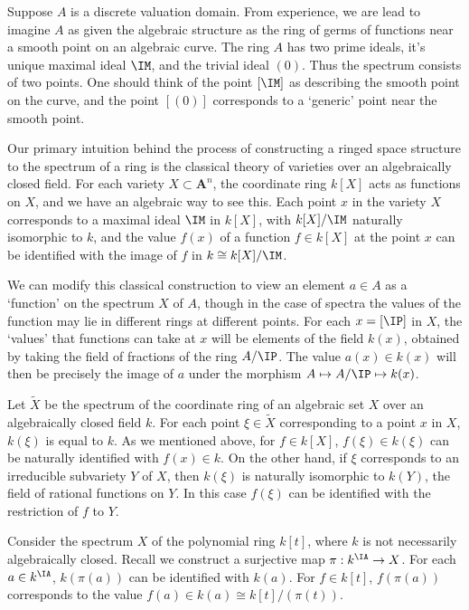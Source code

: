 \begin{example}
    Suppose $A$ is a discrete valuation domain. From experience, we are lead to imagine $A$ as given the algebraic structure as the ring of germs of functions near a smooth point on an algebraic curve. The ring $A$ has two prime ideals, it's unique maximal ideal $\IM$, and the trivial ideal $(0)$. Thus the spectrum consists of two points. One should think of the point $[\IM]$ as describing the smooth point on the curve, and the point $[(0)]$ corresponds to a `generic' point near the smooth point.
\end{example}

Our primary intuition behind the process of constructing a ringed space structure to the spectrum of a ring is the classical theory of varieties over an algebraically closed field. For each variety $X \subset \mathbf{A}^n$, the coordinate ring $k[X]$ acts as functions on $X$, and we have an algebraic way to see this. Each point $x$ in the variety $X$ corresponds to a maximal ideal $\IM$ in $k[X]$, with $k[X]/\IM$ naturally isomorphic to $k$, and the value $f(x)$ of a function $f \in k[X]$ at the point $x$ can be identified with the image of $f$ in $k \cong k[X]/\IM$.

We can modify this classical construction to view an element $a \in A$ as a `function' on the spectrum $X$ of $A$, though in the case of spectra the values of the function may lie in different rings at different points. For each $x = [\IP]$ in $X$, the `values' that functions can take at $x$ will be elements of the field $k(x)$, obtained by taking the field of fractions of the ring $A/\IP$. The value $a(x) \in k(x)$ will then be precisely the image of $a$ under the morphism $A \mapsto A/\IP \mapsto k(x)$.

\begin{example}
    Let $\tilde{X}$ be the spectrum of the coordinate ring of an algebraic set $X$ over an algebraically closed field $k$. For each point $\xi \in \tilde{X}$ corresponding to a point $x$ in $X$, $k(\xi)$ is equal to $k$. As we mentioned above, for $f \in k[X]$, $f(\xi) \in k(\xi)$ can be naturally identified with $f(x) \in k$. On the other hand, if $\xi$ corresponds to an irreducible subvariety $Y$ of $X$, then $k(\xi)$ is naturally isomorphic to $k(Y)$, the field of rational functions on $Y$. In this case $f(\xi)$ can be identified with the restriction of $f$ to $Y$.
\end{example}

\begin{example}
    Consider the spectrum $X$ of the polynomial ring $k[t]$, where $k$ is not necessarily algebraically closed. Recall we construct a surjective map $\pi: k^{\IA} \to X$. For each $a \in k^{\IA}$, $k(\pi(a))$ can be identified with $k(a)$. For $f \in k[t]$, $f(\pi(a))$ corresponds to the value $f(a) \in k(a) \cong k[t]/(\pi(t))$.
\end{example}

